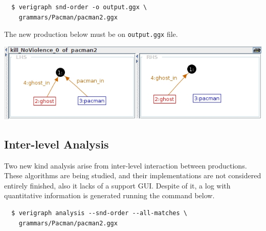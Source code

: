 \documentclass[12pt]{article}
\begin{document}
\begin{verbatim}
  $ verigraph snd-order -o output.ggx \
  	grammars/Pacman/pacman2.ggx
\end{verbatim}

The new production below must be on \texttt{output.ggx} file.

{\noindent\centering\includegraphics[scale = 0.5]{kill.png}\\}

\subsection{Inter-level Analysis}

Two new kind analysis arise from inter-level interaction between productions.
These algorithms are being studied, and their implementations are not considered entirely finished, also it lacks of a support GUI.
Despite of it, a log with quantitative information is generated running the command below.

\begin{verbatim}
  $ verigraph analysis --snd-order --all-matches \
  	grammars/Pacman/pacman2.ggx
\end{verbatim}


\end{document}
